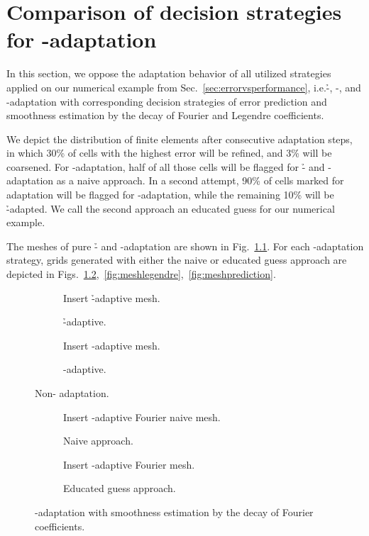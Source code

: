 \chapter{Comparison of decision strategies for \hp-adaptation}
\label{app::strategies}

In this section, we oppose the adaptation behavior of all utilized strategies applied on our numerical example from Sec.~\ref{sec:errorvsperformance}, i.e.\@ \h-, \p-, and \hp-adaptation with corresponding decision strategies of error prediction and smoothness estimation by the decay of Fourier and Legendre coefficients.

We depict the distribution of finite elements after  consecutive adaptation steps, in which 30\% of cells with the highest error will be refined, and 3\% will be coarsened. For \hp-adaptation, half of all those cells will be flagged for \h- and \p-adaptation as a naive approach. In a second attempt, 90\% of cells marked for adaptation will be flagged for \p-adaptation, while the remaining 10\% will be \h-adapted. We call the second approach an educated guess for our numerical example.

The meshes of pure \h- and \p-adaptation are shown in Fig.~\ref{fig:meshnonhp}. For each \hp-adaptation strategy, grids generated with either the naive or educated guess approach are depicted in Figs.~\ref{fig:meshfourier},~\ref{fig:meshlegendre},~\ref{fig:meshprediction}.




\begin{figure}
\begin{subfigure}{.49\textwidth}
  \centering
  Insert \h-adaptive mesh.
  \caption{\h-adaptive.}
\end{subfigure}
\begin{subfigure}{.49\textwidth}
  \centering
  Insert \p-adaptive mesh.
  \caption{\p-adaptive.}
\end{subfigure}
\caption{Non-\hp{} adaptation.}
\label{fig:meshnonhp}
\end{figure}

\begin{figure}
\begin{subfigure}{.49\textwidth}
  \centering
  Insert \hp-adaptive Fourier naive mesh.
  \caption{Naive approach.}
\end{subfigure}
\begin{subfigure}{.49\textwidth}
  \centering
  Insert \hp-adaptive Fourier mesh.
  \caption{Educated guess approach.}
\end{subfigure}
\caption{\hp-adaptation with smoothness estimation by the decay of Fourier coefficients.}
\label{fig:meshfourier}
\end{figure}

